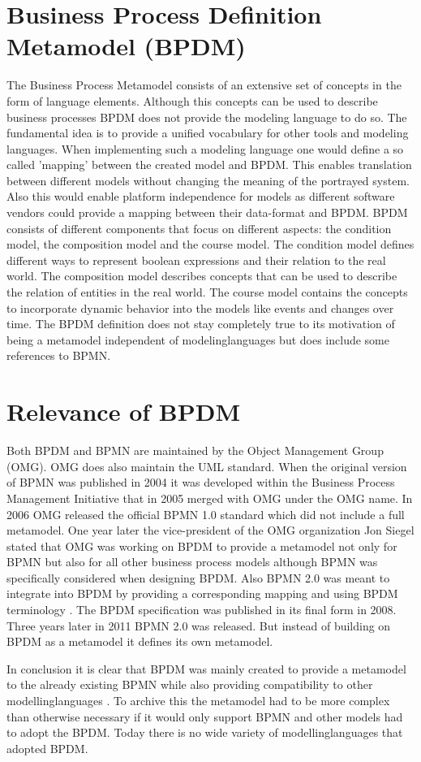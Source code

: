\documentclass[a4paper,11pt]{article}
\begin{document}
\section{Business Process Definition Metamodel (BPDM)}
The Business Process Metamodel consists of an extensive set of concepts in the
form of language elements. Although this concepts can be used to describe
business processes BPDM does not provide the modeling language to do so. The
fundamental idea is to provide a unified vocabulary for other tools and
modeling languages. When implementing such a modeling language one would
define a so called 'mapping' between the created model and BPDM. This enables
translation between different models without changing the meaning of the
portrayed system. Also this would enable platform independence for models as
different software vendors could provide a mapping between their data-format
and BPDM. \cite{omg-kol1} BPDM consists of different components that focus on
different aspects: the condition model, the composition model and the course
model. The condition model defines different ways to represent boolean
expressions and their relation to the real world. The composition model
describes concepts that can be used to describe the relation of entities in
the real world. The course model contains the concepts to incorporate dynamic
behavior into the models like events and changes over time. \cite{bpdm} The
BPDM definition does not stay completely true to its motivation of being a
metamodel independent of modelinglanguages but does include some references to
BPMN.

\section{Relevance of BPDM}
Both BPDM and BPMN are maintained by the Object Management Group (OMG). OMG
does also maintain the UML standard. When the original version of BPMN was
published in 2004 it was developed within the Business Process Management
Initiative that in 2005 merged with OMG under the OMG name. In 2006 OMG
released the official BPMN 1.0 standard which did not include a full
metamodel. One year later the vice-president of the OMG organization Jon
Siegel stated that OMG was working on BPDM to provide a metamodel not only for
BPMN but also for all other business process models although BPMN was
specifically considered when designing BPDM. Also BPMN 2.0 was meant to
integrate into BPDM by providing a corresponding mapping and using BPDM
terminology \cite{omg-kol1}. The BPDM specification was published in its final
form in 2008. Three years later in 2011 BPMN 2.0 was released. But instead of
building on BPDM as a metamodel it defines its own metamodel.

In conclusion it is clear that BPDM was mainly created to provide a metamodel
to the already existing BPMN while also providing compatibility to other
modellinglanguages \cite{blog}. To archive this the metamodel had to be more
complex than otherwise necessary if it would only support BPMN and other
models had to adopt the BPDM. Today there is no wide variety of
modellinglanguages that adopted BPDM.



\end{document}
